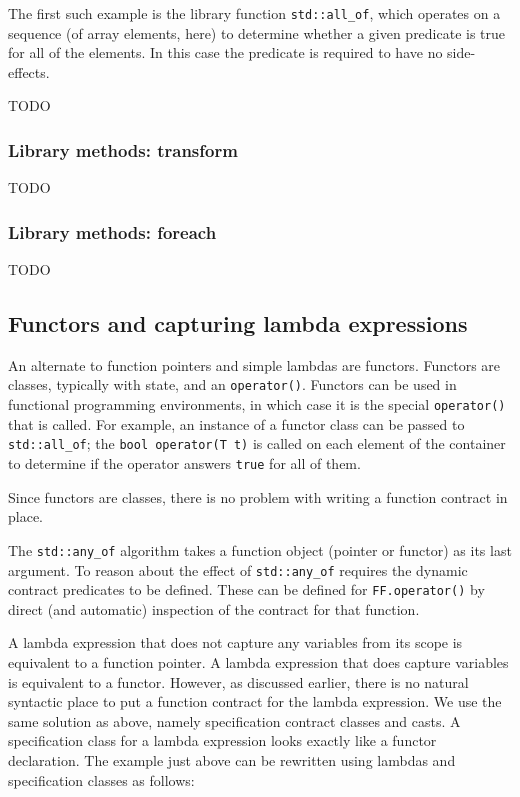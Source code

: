 {The first such example is the library function \lstinline|std::all_of|,
which operates on a sequence (of array elements, here) to determine
whether a given predicate is true for all of the elements. In this
case the predicate is required to have no side-effects.

TODO

\subsubsection{Library methods: transform}

TODO

\subsubsection{Library methods: foreach}

TODO

\subsection{Functors and capturing lambda expressions}
\label{sec:functors}

An alternate to function pointers and simple lambdas are functors. Functors are classes, typically with state, and an
\lstinline|operator()|. Functors can be used in functional programming environments, in which case it is the special 
\lstinline|operator()| that is called. For example, an instance of a functor class can be passed to 
\lstinline|std::all_of|; the \lstinline|bool operator(T t)| is called on each element of the container to determine if
the operator answers \lstinline|true| for all of them.

Since functors are classes, there is no problem with writing a function contract in place.



The \lstinline|std::any_of| algorithm takes a function object (pointer or functor) as its last argument. To reason about
the effect of \lstinline|std::any_of| requires the dynamic contract predicates to be defined. These can be defined for 
\lstinline|FF.operator()| by direct (and automatic) inspection of the contract for that function.

A lambda expression that does not capture any variables from its scope is equivalent to a function pointer.
A lambda expression
that does capture variables is equivalent to a functor. 
However, as discussed earlier, there is no natural syntactic place to
put a function contract for the lambda expression. We use the same solution as above, namely specification contract classes and casts.
A specification class for a lambda expression looks exactly like a functor declaration. 
The example just above can be rewritten using lambdas and specification classes as follows:

}
